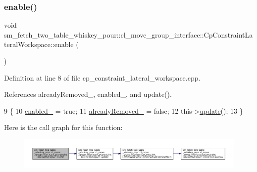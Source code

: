 \subsubsection{\texorpdfstring{enable()}{enable()}}
{\footnotesize\ttfamily void sm\+\_\+fetch\+\_\+two\+\_\+table\+\_\+whiskey\+\_\+pour\+::cl\+\_\+move\+\_\+group\+\_\+interface\+::\+Cp\+Constraint\+Lateral\+Workspace\+::enable (\begin{DoxyParamCaption}{ }\end{DoxyParamCaption})}



Definition at line 8 of file cp\+\_\+constraint\+\_\+lateral\+\_\+workspace.\+cpp.



References already\+Removed\+\_\+, enabled\+\_\+, and update().


\begin{DoxyCode}
9         \{
10             \hyperlink{classsm__fetch__two__table__whiskey__pour_1_1cl__move__group__interface_1_1CpConstraintLateralWorkspace_a5a7dd0aa75d38aa540c88b0b7da347ec}{enabled\_} = \textcolor{keyword}{true};
11             \hyperlink{classsm__fetch__two__table__whiskey__pour_1_1cl__move__group__interface_1_1CpConstraintLateralWorkspace_ab1dfe22f5f87a4f8727c9a1478afb1bc}{alreadyRemoved\_} = \textcolor{keyword}{false};
12             this->\hyperlink{classsm__fetch__two__table__whiskey__pour_1_1cl__move__group__interface_1_1CpConstraintLateralWorkspace_afbbf07ecc60348ce0f40f6aa0c6fd6f3}{update}();
13         \}
\end{DoxyCode}
Here is the call graph for this function\+:
\nopagebreak
\begin{figure}[H]
\begin{center}
\leavevmode
\includegraphics[width=350pt]{classsm__fetch__two__table__whiskey__pour_1_1cl__move__group__interface_1_1CpConstraintLateralWorkspace_a35dcb27d6434d98e73c0cbe5ddf88bca_cgraph}
\end{center}
\end{figure}
\mbox{\label{classsm__fetch__two__table__whiskey__pour_1_1cl__move__group__interface_1_1CpConstraintLateralWorkspace_a420fcf0fc6f89007a313e70458bca06c}} 
